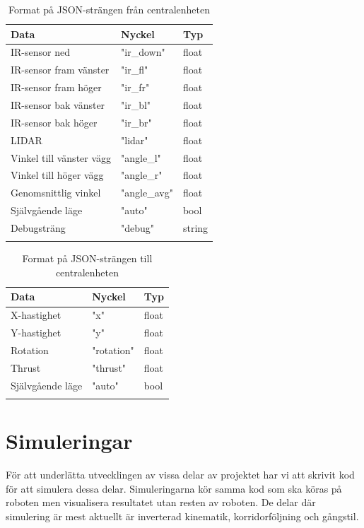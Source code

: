 \documentclass[a4paper,titlepage,12pt]{article}
\begin{document}
	\begin{longtable}[c]{l l l }
        \textbf{Data} & \textbf{Nyckel} & \textbf{Typ} \\ \midrule
        IR-sensor ned & "ir\_down" & float \\
        IR-sensor fram vänster & "ir\_fl" & float \\
        IR-sensor fram höger & "ir\_fr" & float \\
        IR-sensor bak vänster & "ir\_bl" & float \\
        IR-sensor bak höger & "ir\_br" & float \\
        LIDAR & "lidar" & float \\
        Vinkel till vänster vägg & "angle\_l" & float \\
        Vinkel till höger vägg & "angle\_r" & float \\
        Genomsnittlig vinkel & "angle\_avg" & float \\
        Självgående läge & "auto" & bool \\
        Debugsträng & "debug" & string \\

		\caption{Format på JSON-strängen från
        centralenheten\label{table:guimessagesfromcentral}}
	\end{longtable}

	\begin{longtable}[c]{l l l }
        \textbf{Data} & \textbf{Nyckel} & \textbf{Typ} \\ \midrule
        X-hastighet & "x" & float \\
        Y-hastighet & "y" & float \\
        Rotation & "rotation" & float \\
        Thrust & "thrust" & float \\
        Självgående läge & "auto" & bool \\

		\caption{Format på JSON-strängen till
        centralenheten\label{table:guimessagestocentral}}
	\end{longtable}
    

    \newpage
	\section{Simuleringar}
	För att underlätta utvecklingen av vissa delar av projektet har vi att
    skrivit kod för att simulera dessa delar. Simuleringarna kör samma kod som
    ska köras på roboten men visualisera resultatet utan resten av roboten. De
    delar där simulering är mest aktuellt är inverterad kinematik,
    korridorföljning och gångstil.
\end{document}
